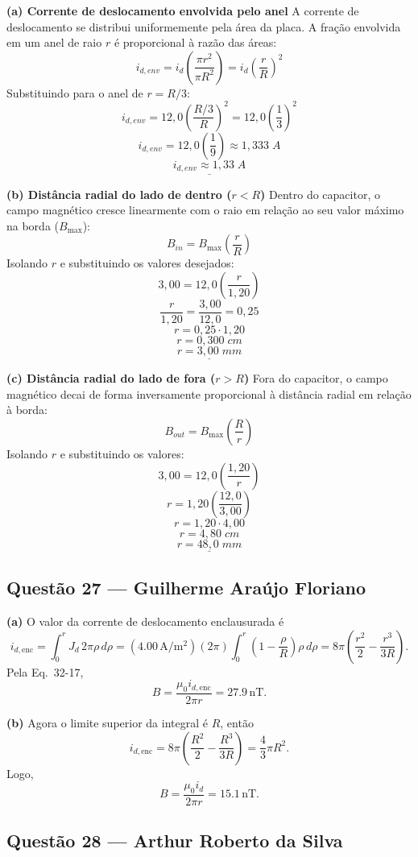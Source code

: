 \documentclass[12pt,a4paper]{article}
\begin{document}
\vspace{0.2cm}
\textbf{(a) Corrente de deslocamento envolvida pelo anel}
A corrente de deslocamento se distribui uniformemente pela área da placa. A fração envolvida em um anel de raio \(r\) é proporcional à razão das áreas:
\[i_{d,env} = i_d \left( \frac{\pi r^2}{\pi R^2} \right) = i_d \left( \frac{r}{R} \right)^2\]
Substituindo para o anel de \(r = R/3\):
\[i_{d,env} = 12,0 \left( \frac{R/3}{R} \right)^2 = 12,0 \left( \frac{1}{3} \right)^2\]
\[i_{d,env} = 12,0 \left( \frac{1}{9} \right) \approx 1,333\;A\]
\[\underline{i_{d,env} \approx 1,33\;A}\]

\vspace{0.2cm}
\textbf{(b) Distância radial do lado de dentro (\(r < R\))}
Dentro do capacitor, o campo magnético cresce linearmente com o raio em relação ao seu valor máximo na borda (\(B_{\max}\)):
\[B_{in} = B_{\max} \left( \frac{r}{R} \right)\]
Isolando \(r\) e substituindo os valores desejados:
\[3,00 = 12,0 \left( \frac{r}{1,20} \right)\]
\[\frac{r}{1,20} = \frac{3,00}{12,0} = 0,25\]
\[r = 0,25 \cdot 1,20\]
\[r = 0,300\;cm\]
\[\underline{r = 3,00\;mm}\]

\vspace{0.2cm}
\textbf{(c) Distância radial do lado de fora (\(r > R\))}
Fora do capacitor, o campo magnético decai de forma inversamente proporcional à distância radial em relação à borda:
\[B_{out} = B_{\max} \left( \frac{R}{r} \right)\]
Isolando \(r\) e substituindo os valores:
\[3,00 = 12,0 \left( \frac{1,20}{r} \right)\]
\[r = 1,20 \left( \frac{12,0}{3,00} \right)\]
\[r = 1,20 \cdot 4,00\]
\[r = 4,80\;cm\]
\[\underline{r = 48,0\;mm}\]

\subsection{Questão 27 — Guilherme Araújo Floriano}

	\textbf{(a)} O valor da corrente de deslocamento enclausurada é
\[
i_{d,\mathrm{enc}} = \int_0^r J_d\,2\pi\rho\,d\rho
= (4.00\,\mathrm{A/m^2})(2\pi)\int_0^r\left(1-\frac{\rho}{R}\right)\rho\,d\rho
= 8\pi\left(\frac{r^2}{2}-\frac{r^3}{3R}\right).
\]
Pela Eq.~32-17,
\[
B=\frac{\mu_0 i_{d,\mathrm{enc}}}{2\pi r}=27.9\,\mathrm{nT}.
\]

\textbf{(b)} Agora o limite superior da integral é $R$, então
\[
i_{d,\mathrm{enc}}=8\pi\left(\frac{R^2}{2}-\frac{R^3}{3R}\right)=\frac{4}{3}\pi R^2.
\]
Logo,
\[
B=\frac{\mu_0 i_d}{2\pi r}=15.1\,\mathrm{nT}.
\]

\subsection{Questão 28 — Arthur Roberto da Silva}
\end{document}
